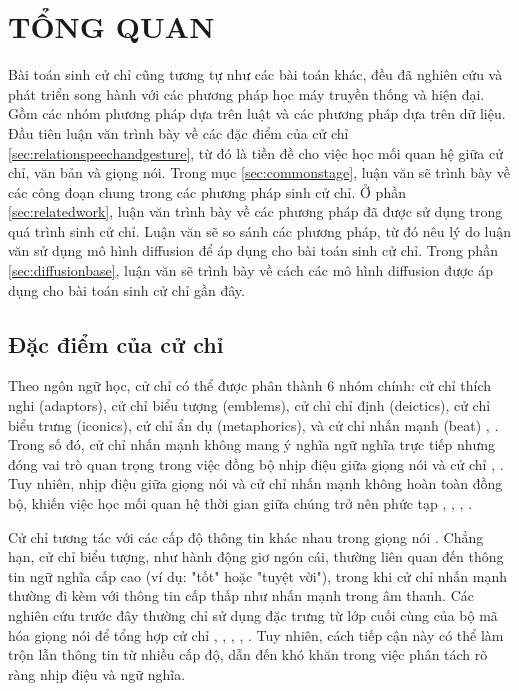 \chapter{TỔNG QUAN}
\label{Chapter2}

Bài toán sinh cử chỉ cũng tương tự như các bài toán khác, đều đã nghiên cứu và phát triển song hành với các phương pháp học máy truyền thống và hiện đại. Gồm các nhóm phương pháp dựa trên luật và các phương pháp dựa trên dữ liệu.  Đầu tiên luận văn trình bày về các đặc điểm của cử chỉ \autoref{sec:relationspeechandgesture}, từ đó là tiền đề cho việc học mối quan hệ giữa cử chỉ, văn bản và giọng nói. Trong mục \autoref{sec:commonstage}, luận văn sẽ trình bày về các công đoạn chung trong các phương pháp sinh cử chỉ.
Ở phần \autoref{sec:relatedwork}, luận văn trình bày về các phương pháp đã được sử dụng trong quá trình sinh cử chỉ. Luận văn sẽ so sánh các phương pháp, từ đó nêu lý do luận văn sử dụng mô hình diffusion để áp dụng cho bài toán sinh cử chỉ.
Trong phần \autoref{sec:diffusionbase}, luận văn sẽ trình bày về cách các mô hình diffusion được áp dụng cho bài toán sinh cử chỉ gần đây.

\section{Đặc điểm của cử chỉ}
\label{sec:relationspeechandgesture}

Theo ngôn ngữ học, cử chỉ có thể được phân thành 6 nhóm chính: cử chỉ thích nghi (adaptors), cử chỉ biểu tượng (emblems), cử chỉ chỉ định (deictics), cử chỉ biểu trưng (iconics), cử chỉ ẩn dụ (metaphorics), và cử chỉ nhấn mạnh (beat) \cite{ekman1969repertoire}, \cite{sebeok2011advances}. Trong số đó, cử chỉ nhấn mạnh không mang ý nghĩa ngữ nghĩa trực tiếp nhưng đóng vai trò quan trọng trong việc đồng bộ nhịp điệu giữa giọng nói và cử chỉ \cite{kipp2005gesture}, \cite{sebeok2011advances}. Tuy nhiên, nhịp điệu giữa giọng nói và cử chỉ nhấn mạnh không hoàn toàn đồng bộ, khiến việc học mối quan hệ thời gian giữa chúng trở nên phức tạp \cite{mcclave1994gestural}, \cite{bhattacharya2021speech2affectivegestures}, \cite{kucherenko2020gesticulator}, \cite{yoon2020speech}.

Cử chỉ tương tác với các cấp độ thông tin khác nhau trong giọng nói \cite{sebeok2011advances}. Chẳng hạn, cử chỉ biểu tượng, như hành động giơ ngón cái, thường liên quan đến thông tin ngữ nghĩa cấp cao (ví dụ: "tốt" hoặc "tuyệt vời"), trong khi cử chỉ nhấn mạnh thường đi kèm với thông tin cấp thấp như nhấn mạnh trong âm thanh. Các nghiên cứu trước đây thường chỉ sử dụng đặc trưng từ lớp cuối cùng của bộ mã hóa giọng nói để tổng hợp cử chỉ \cite{alexanderson2020style}, \cite{bhattacharya2021speech2affectivegestures}, \cite{kucherenko2021large}, \cite{qian2021speech}, \cite{yoon2022genea}. Tuy nhiên, cách tiếp cận này có thể làm trộn lẫn thông tin từ nhiều cấp độ, dẫn đến khó khăn trong việc phân tách rõ ràng nhịp điệu và ngữ nghĩa.

